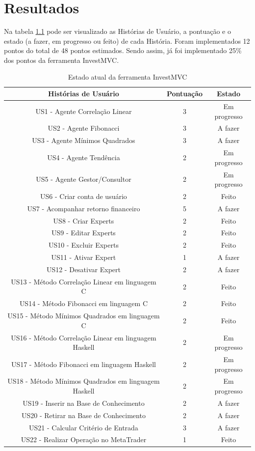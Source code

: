 \chapter{Resultados}

Na tabela \ref{estadoAtual} pode ser visualizado as Histórias de Usuário, a pontuação e o estado (a fazer, em progresso ou feito) de cada História. Foram implementados 12 pontos do total de 48 pontos estimados. Sendo assim, já foi implementado 25\% dos pontos da ferramenta InvestMVC.

\begin{table}[H]
\caption{Estado atual da ferramenta InvestMVC}
\begin{center}
    \begin{tabular}{ | c | c | c |}
    \hline
    \textbf{Histórias de Usuário} & \textbf{Pontuação} & \textbf{Estado} \\ \hline

US1 - Agente Correlação Linear & 3 & Em progresso\\ \hline
US2 - Agente Fibonacci & 3 & A fazer \\ \hline
US3 - Agente Mínimos Quadrados & 3 & A fazer\\ \hline
US4 -  Agente Tendência & 2 & Em progresso\\ \hline
US5 - Agente Gestor/Consultor & 2& Em progresso\\ \hline
US6 - Criar conta de usuário & 2 & Feito\\ \hline
US7 - Acompanhar retorno financeiro & 5 & A fazer\\ \hline
US8 - Criar Experts & 2 & Feito\\ \hline
US9 - Editar Experts & 2 & Feito\\ \hline
US10 - Excluir Experts & 2 & Feito\\ \hline
US11 - Ativar Expert & 1 & A fazer\\ \hline
US12 - Desativar Expert & 2 & A fazer \\ \hline
US13 - Método Correlação Linear em linguagem C & 2 & Feito\\ \hline
US14 - Método Fibonacci em linguagem C & 2 & Feito\\ \hline
US15 - Método Mínimos Quadrados em linguagem C & 2 & Feito\\ \hline
US16 - Método Correlação Linear em linguagem Haskell & 2 & Em progresso\\ \hline
US17 - Método Fibonacci em linguagem Haskell & 2 & Em progresso\\ \hline
US18 - Método Mínimos Quadrados em linguagem Haskell & 2 & Em progresso\\ \hline
US19 - Inserir na Base de Conhecimento & 2 & A fazer\\ \hline
US20 - Retirar na Base de Conhecimento & 2 & A fazer\\ \hline
US21 - Calcular Critério de Entrada & 3 & A fazer\\ \hline
US22 - Realizar Operação no MetaTrader& 1 & Feito\\ \hline
\end{tabular}
\end{center}
\label{estadoAtual}
\end{table}


